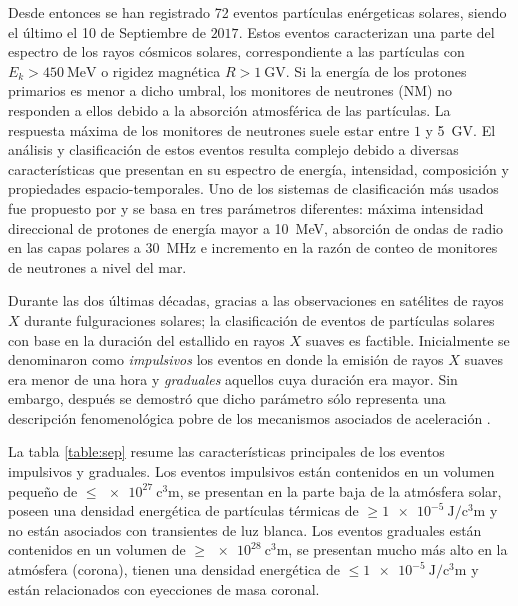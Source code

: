 Desde entonces se han registrado \num{72} eventos partículas enérgeticas solares, siendo el último el \num{10} de Septiembre de $2017$. Estos eventos caracterizan una parte del espectro de los rayos cósmicos solares, correspondiente a las partículas con $E_{k}>\SI{450}{\mega\electronvolt}$ o rigidez magnética $R> \SI{1}{\giga\volt}$. Si la energía de los protones primarios es menor a dicho umbral, los monitores de neutrones (NM) no responden a ellos debido a la absorción atmosférica de las partículas. La respuesta máxima de los monitores de neutrones suele estar entre $1$ y \SI{5}{\giga\volt}. El análisis y clasificación de estos eventos resulta complejo debido a diversas características que presentan en su espectro de energía, intensidad, composición y propiedades espacio-temporales. Uno de los sistemas de clasificación más usados fue propuesto por \cite{shea71} y se basa en tres parámetros diferentes: máxima intensidad direccional de protones de energía mayor a \SI{10}{\mega\electronvolt}, absorción de ondas de radio en las capas polares a \SI{30}{\mega\hertz} e incremento en la razón de conteo de monitores de neutrones a nivel del mar.

Durante las dos últimas décadas, gracias a las observaciones en satélites de rayos $X$ durante fulguraciones solares; la clasificación de eventos de partículas solares con base en la duración del estallido en rayos $X$ suaves es factible. Inicialmente se denominaron como \emph{impulsivos} los eventos en donde la emisión de rayos $X$ suaves era menor de una hora y \emph{graduales} aquellos cuya duración era mayor. Sin embargo, después se demostró que dicho parámetro sólo representa una descripción fenomenológica pobre de los mecanismos asociados de aceleración \cite{reames96}.

La tabla \ref{table:sep} resume las características principales de los eventos impulsivos y graduales. Los eventos impulsivos están contenidos en un volumen pequeño de $\leq\SI{e27}{\cubic\centi\metre}$, se presentan en la parte baja de la atmósfera solar, poseen una densidad energética de partículas térmicas de $\geq\SI{1e-5}{\joule\per\cubic\centi\metre}$ y no están asociados con transientes de luz blanca. Los eventos graduales están contenidos en un volumen de $\geq\SI{e28}{\cubic\centi\metre}$, se presentan mucho más alto en la atmósfera (corona), tienen una densidad energética de $\leq\SI{1e-5}{\joule\per\cubic\centi\metre}$ y están relacionados con eyecciones de masa coronal.

